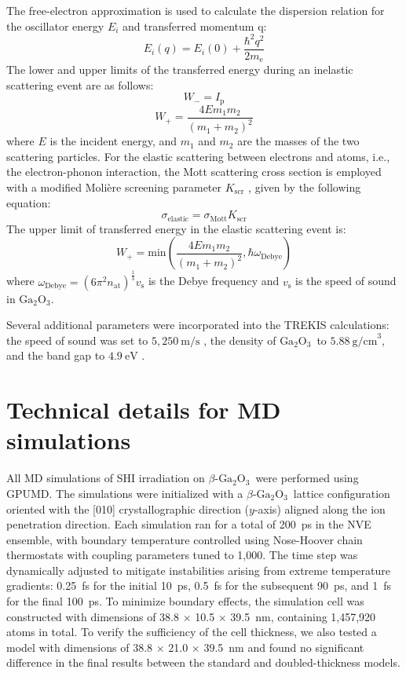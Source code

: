 \documentclass[%
reprint,
superscriptaddress,
 amsmath,amssymb,
 aps,
]{revtex4-2}
\newcommand{\ga}{$\text{Ga}_2\text{O}_3$}
\begin{document}
The free-electron approximation is used to calculate the dispersion relation 
for the oscillator energy $E_{i}$ and transferred momentum q: 
\begin{equation} 
E_{i}(q) = E_{i}(0) + \frac{\hbar^{2}q^{2}}{2m_{\text{e}}} 
\end{equation} 
The lower and upper limits of the transferred energy during an inelastic 
scattering event are as follows: 
\begin{equation} 
W_{-} = I_{\text{p}} 
\end{equation} 
\begin{equation} 
W_{+} = \frac{4Em_{1}m_{2}}{(m_{1}+m_{2})^{2}} 
\end{equation} 
where $E$ is the incident energy, and $m_{1}$ and $m_{2}$ are the masses of the 
two scattering particles. 
For the elastic scattering between electrons and atoms, i.e., the 
electron-phonon interaction, the Mott scattering cross section is employed with 
a modified Moli\`ere screening parameter $K_{\text{scr}}$ \cite{Jenkins2012}, given 
by the following equation: 
\begin{equation} 
\sigma_{\text{elastic}} = \sigma_{\text{Mott}}K_{\text{scr}} 
\end{equation} 
The upper limit of transferred energy in the elastic scattering event is: 
\begin{equation} 
W_{+} = \mathrm{min}(\frac{4Em_{1}m_{2}}{(m_{1}+m_{2})^{2}}, 
\hbar\omega_{\text{Debye}}) 
\end{equation} 
where $\omega_{\text{Debye}}=(6\pi^{2}n_{\text{at}})^{\frac{1}{3}}v_{\text{s}}$ is the Debye 
frequency and $v_{\text{s}}$ is the speed of sound in \ga. 
 
Several additional parameters were incorporated into the TREKIS calculations: 
the speed of sound was set to $5,250~\mathrm{m/s}$ \cite{wright_acoustic_2025}, the density 
of \ga\ to $5.88~\mathrm{g/cm}^3$, and the band gap to 
$4.9~\mathrm{eV}$ \cite{zhang_tight-binding_2022}.

\section{Technical details for MD simulations}
\label{app:md}
All MD simulations of SHI irradiation on $\beta$-\ga\ were performed using GPUMD. 
The simulations were initialized with a $\beta$-\ga\ lattice configuration oriented with the 
[010] crystallographic direction ($y$-axis) aligned along the ion penetration direction. 
Each simulation ran for a total of 200~ps in the NVE ensemble, with boundary temperature 
controlled using Nose-Hoover chain thermostats with coupling parameters tuned to 1,000. 
The time step was dynamically adjusted to mitigate instabilities arising from extreme 
temperature gradients: 0.25~fs for the initial 10~ps, 0.5~fs for the subsequent 90~ps, 
and 1~fs for the final 100~ps. 
To minimize boundary effects, the simulation cell was constructed with dimensions of 
38.8 $\times$ 10.5 $\times$ 39.5~nm, containing 1,457,920 atoms in total. 
To verify the sufficiency of the cell thickness, we also tested a model with dimensions of 
38.8 $\times$ 21.0 $\times$ 39.5~nm and found no significant difference in the final 
results between the standard and doubled-thickness models. 
\end{document}
